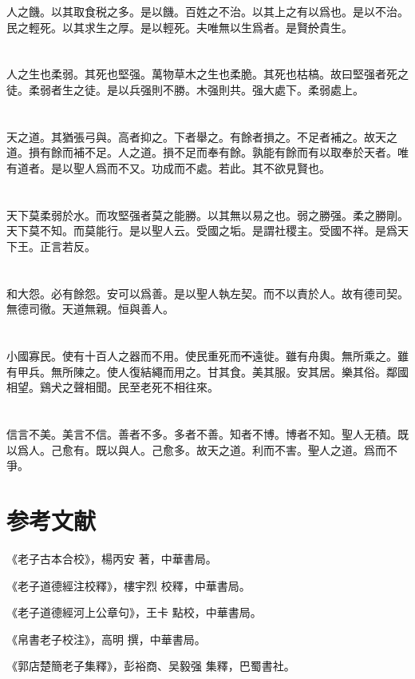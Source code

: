 \documentclass[a5paper]{ctexbook}
\newcommand{\he}[1]{\textcolor[RGB]{255,0,255}{#1}}
\newcommand{\bo}[1]{\textcolor[RGB]{0,255,255}{#1}}
\def\del{\sout}
\begin{document}
    \bo{人}之饑。以其\bo{取}食税之多。是以饑。\bo{百姓之不治}。以其上之\bo{有以爲}\bo{也}。是以\bo{不治}。民之輕死。以其求生之厚。是以輕死。夫唯無以生爲者。是賢\bo{\del{於}}貴生。

    \chapter{}

    人之生也柔弱。其死也堅强。萬物草木之生也柔脆。其死也枯槁。故\bo{曰}堅强者死之徒。柔弱者生之徒。是以兵强則不勝。木强則\he{共}。强大處下。柔弱處上。

    \chapter{}

    天之道。其猶張弓與。高者抑之。下者舉之。有餘者損之。不足者補之。\bo{故}天之道。損有餘而補不足。人之道。損不足而奉有餘。\bo{孰能有餘而有以取奉於天者}。唯有道者。是以聖人爲而不\bo{又}。功成而不處。\bo{若此}。其不欲見賢也。

    \chapter{}

    天下莫柔弱於水。而攻堅强者莫之能勝。\bo{以其無以易之也}。弱之勝强。柔之勝剛。天下莫不知。\bo{而}莫能行。是以聖人云。受國之垢。是謂社稷主。受國不祥。是爲天下王。正言若反。

    \chapter{}

    和大怨。必有餘怨。安可以爲善。是以聖人執左契。而不以責於人。\bo{故}有德司契。無德司徹。天道無親。\bo{恒}與善人。

    \chapter{}

    小國寡民。\bo{使有十百人之器而不用}。使民重死而\bo{\del{不}}遠徙。雖有舟輿。無所乘之。雖有甲兵。無所陳之。使人復結繩而用之。甘其食。美其服。安其居。樂其俗。鄰國相望。鷄犬之聲相聞。民至老死不相往來。

    \chapter{}

    信言不美。美言不信。善者不\bo{多}。\bo{多}者不善。知者不博。博者不知。聖人\bo{无}積。既以爲人。己愈有。既以與人。己愈多。\bo{故}天之道。利而不害。\bo{\del{聖}}人之道。爲而不爭。

    \chapter*{参考文献}

    《老子古本合校》，楊丙安 著，中華書局。

    《老子道德經注校釋》，樓宇烈 校釋，中華書局。

    《老子道德經河上公章句》，王卡 點校，中華書局。

    《帛書老子校注》，高明 撰，中華書局。

    《郭店楚簡老子集釋》，彭裕商、吴毅强 集釋，巴蜀書社。
\end{document}
